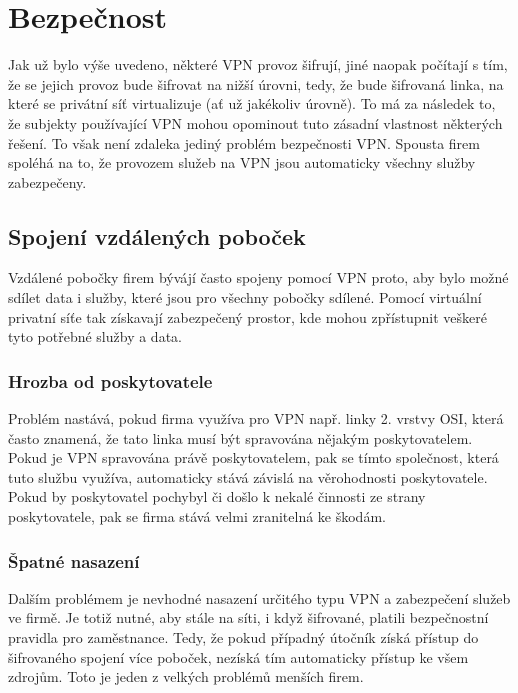 \documentclass[thesis=B,czech]{FITthesis}[2012/06/26]
\begin{document}
\chapter{Bezpečnost}

Jak už bylo výše uvedeno, některé VPN provoz šifrují, jiné naopak počítají s tím, že se jejich provoz bude šifrovat na nižší úrovni, tedy, že bude šifrovaná linka, na které se privátní síť virtualizuje (ať už jakékoliv úrovně).
To má za následek to, že subjekty používající VPN mohou opominout tuto zásadní vlastnost některých řešení. To však není zdaleka jediný problém bezpečnosti VPN. Spousta firem spoléhá na to, že provozem služeb na VPN jsou automaticky
všechny služby zabezpečeny.\cite{sec_mta}

  \section{Spojení vzdálených poboček}

  Vzdálené pobočky firem bývájí často spojeny pomocí VPN proto, aby bylo možné sdílet data i služby, které jsou pro všechny pobočky sdílené. Pomocí virtuální privatní síťe tak získavají zabezpečený prostor, kde mohou zpřístupnit veškeré tyto potřebné služby a data.

    \subsection{Hrozba od poskytovatele}
      Problém nastává, pokud firma využíva pro VPN např. linky 2. vrstvy OSI, která často znamená, že tato linka musí být spravována nějakým poskytovatelem. Pokud je VPN spravována právě poskytovatelem, pak se tímto společnost, která tuto službu využíva, automaticky stává
      závislá na věrohodnosti poskytovatele. Pokud by poskytovatel pochybyl či došlo k nekalé činnosti ze strany poskytovatele, pak se firma stává velmi zranitelná ke škodám.

    \subsection{Špatné nasazení}
      Dalším problémem je nevhodné nasazení určitého typu VPN a zabezpečení služeb ve firmě. Je totiž nutné, aby stále na síti, i když šifrované, platili bezpečnostní pravidla pro zaměstnance. Tedy, že pokud případný útočník získá přístup do šifrovaného spojení více poboček,
      nezíská tím automaticky přístup ke všem zdrojům. Toto je jeden z velkých problémů menších firem.\cite{sec_mta}
\end{document}
